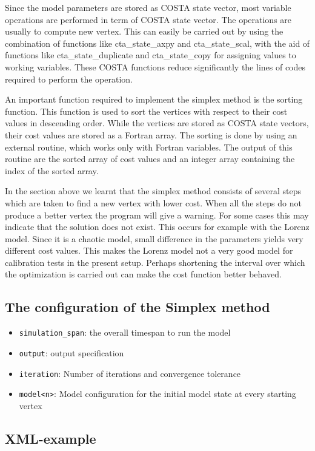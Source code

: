 Since the model parameters are stored as COSTA state vector, most variable
operations are performed in term of COSTA state vector. The operations are
usually to compute new vertex. This can easily be carried out by using the
combination of functions like cta\_state\_axpy and cta\_state\_scal, with
the aid of functions like cta\_state\_duplicate and cta\_state\_copy for
assigning values to working variables. These COSTA functions reduce
significantly the lines of codes required to perform the operation.

An important function required to implement the simplex method is the sorting
function. This function is used to sort the vertices with respect to their
cost values in descending order. While the vertices are stored as COSTA
state vectors, their cost values are stored as a Fortran array. The sorting
is done by using an external routine, which works only with Fortran
variables. The output of this routine are the sorted array of cost values
and an integer array containing the index of the sorted array.

In the section above  we learnt that the simplex method consists
of several steps which are taken to find a new vertex with lower cost. When
all the steps do not produce a better vertex the program will give a
warning. For some cases this may indicate that the solution does not exist.
This occurs for example with the Lorenz model. Since it is a chaotic model,
small difference in the parameters yields very different cost values. This
makes the Lorenz model not a very good model for calibration tests in the
present setup. Perhaps shortening the interval over which the optimization
is carried out can make the cost function better behaved.
\subsection{The configuration of the Simplex method}
\begin{itemize}
\item {\tt simulation\_span}: the overall timespan to run the model
\item {\tt output}: output specification
\item {\tt iteration}: Number of iterations and convergence tolerance
\item {\tt model<n>}: Model configuration for the initial model state at every
starting vertex
\end{itemize}

\subsection{XML-example}

